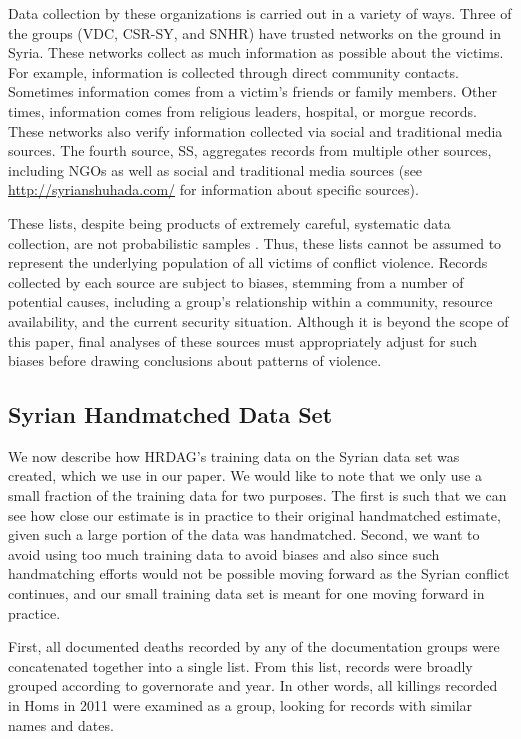 \documentclass[aoas]{imsart}
\begin{document}
Data collection by these organizations is carried out in a variety of ways. Three of the groups (VDC, CSR-SY, and SNHR) have trusted networks on the ground in Syria.  These networks collect as much information as possible about the victims. For example, information is collected  through direct community contacts. Sometimes information comes from a victim's friends or family members. Other times, information comes from religious leaders, hospital, or morgue records.  These networks also verify information collected via social and traditional media sources.  The fourth source, SS, aggregates records from multiple other sources, including NGOs as well as social and traditional media sources (see \url{http://syrianshuhada.com/} for information about specific sources).

These lists, despite being products of extremely careful, systematic data collection, are not probabilistic samples \citep{Sig2015, IOAS2015, CJLS2015, price2014updated}. Thus, these lists cannot be assumed to represent the underlying population of all victims of conflict violence.  Records collected by each source are subject to biases, stemming from a number of potential causes, including a group's relationship within a community, resource availability, and the current security situation.  Although it is beyond the scope of this paper, final analyses of these sources must appropriately adjust for such biases before drawing conclusions about patterns of violence.

\subsection{Syrian Handmatched Data Set}
\label{app:hand}
We now describe how HRDAG's training data on the Syrian data set was created, which we use in our paper. We would like to note that we only use a small fraction of the training data for two purposes. The first is such that we can see how close our estimate is in practice to their original handmatched estimate, given such a large portion of the data was handmatched. Second, we want to avoid using too much training data to avoid biases and also since such handmatching efforts would not be possible moving forward as the Syrian conflict continues, and our small training data set is meant for one moving forward in practice.

First, all documented deaths recorded by any of the documentation groups were concatenated together into a single list. From this list, records were broadly grouped according to governorate and year. In other words, all killings recorded in Homs in 2011 were examined as a group, looking for records with similar names and dates.
\end{document}
